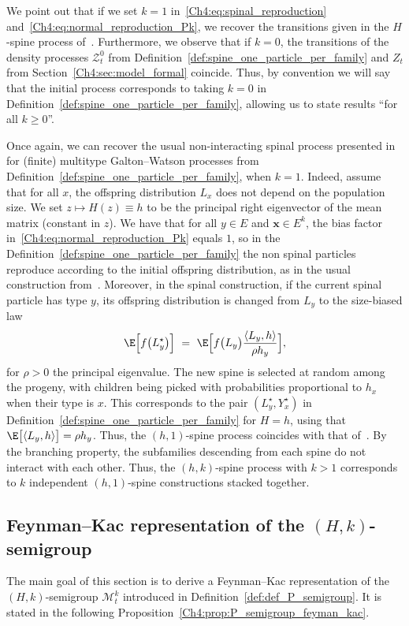 \begin{refsegment}
   We point out that if we set $k=1$ in~\eqref{Ch4:eq:spinal_reproduction} and~\eqref{Ch4:eq:normal_reproduction_Pk}, we recover the transitions given in the $H$-spine process of~\citet[Section 3]{Bansaye}.
Furthermore, we observe that if $k=0$, the transitions of the density processes $\mathcal{Z}^0_t$ from Definition~\ref{def:spine_one_particle_per_family} and $Z_t$ from Section~\ref{Ch4:sec:model_formal} coincide. Thus, by convention we will say that the initial process corresponds to taking $k=0$ in Definition~\ref{def:spine_one_particle_per_family}, allowing us to state results ``for all $k\geq 0$''. 
\begin{rem}
Once again, we can recover the usual non-interacting spinal process presented in~\cite{kurtz_conceptual_1997} for (finite) multitype Galton--Watson processes from Definition~\ref{def:spine_one_particle_per_family}, when $k=1$. Indeed, assume that for all $x$, the offspring distribution $L_x$ does not depend on the population size. We set $z\mapsto H(z)\equiv  h$ to be the principal right eigenvector of the mean matrix (constant in $z$). We have that for all $y\in E$ and $\bm x\in E^k$, the bias factor in~\eqref{Ch4:eq:normal_reproduction_Pk} equals $1$, so in the Definition~\ref{def:spine_one_particle_per_family} the non spinal particles reproduce according to the initial offspring distribution, as in the usual construction from~\cite{kurtz_conceptual_1997}.  Moreover, in the spinal construction, if the current spinal particle has type $y$, its offspring distribution is changed from $L_y$ to the size-biased law 
\[
\E\Big[f\big(L^\star_y\big)\Big]\ =\ \E\Big[f\big(L_y\big)\frac{\langle L_y,h\rangle}{\rho h_y}\Big],
\]
for $\rho>0$ the principal eigenvalue. The new spine is selected at random among the progeny, with children being picked with probabilities proportional to $h_x$ when their type is $x$. This corresponds to the pair $(L^\star_y, Y^\star_x)$ in Definition~\ref{def:spine_one_particle_per_family} for $H=h$, using that $\E\big[\langle L_y, h\rangle\big]=\rho h_y$. Thus, the $(h,1)$-spine process coincides with that of~\cite{kurtz_conceptual_1997}. By the branching property, the subfamilies descending from each spine do not interact with each other. Thus, the $(h,k)$-spine process with $k>1$ corresponds to $k$ independent $(h,1)$-spine constructions  stacked together.
\end{rem}

\subsection{Feynman--Kac representation of the $(H,k)$-semigroup}
\label{sect:FK}
The main goal of this section is to derive a Feynman--Kac representation of the $(H,k)$-semigroup   $\mathcal{M}^k_t$ introduced in Definition~\ref{def:def_P_semigroup}. It is stated in the following Proposition~\ref{Ch4:prop:P_semigroup_feyman_kac}. 


\end{refsegment}
